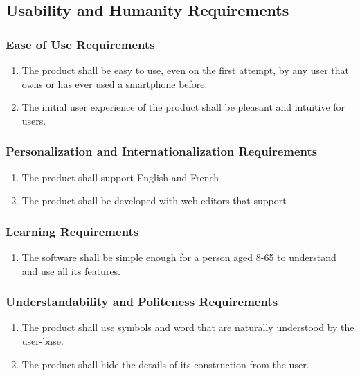 \documentclass[]{article}
\begin{document}

\subsection{Usability and Humanity Requirements}
\label{sub:usability_and_humanity_requirements}

\subsubsection{Ease of Use Requirements}
\label{ssub:ease_of_use_requirements}
\begin{enumerate}[{UH}1. ]
	\item The product shall be easy to use, even on the first attempt, by any user that owns or has ever used a smartphone before.
	\item The initial user experience of the product shall be pleasant and intuitive for users.
\end{enumerate}

\subsubsection{Personalization and Internationalization Requirements}
\label{ssub:personalization_and_internationalization_requirements}
\begin{enumerate}[{UH}1. ]
	\item The product shall support English and French
	\item The product shall be developed with web editors that support
\end{enumerate}

\subsubsection{Learning Requirements}
\label{ssub:learning_requirements}
\begin{enumerate}[{UH}1. ]
	\item The software shall be simple enough for a person aged 8-65 to understand and use all its features.
\end{enumerate}

\subsubsection{Understandability and Politeness Requirements}
\label{ssub:understandability_and_politeness_requirements}
\begin{enumerate}[{UH}1. ]
	\item  The product shall use symbols and word that are naturally understood by the user-base.
	\item  The product shall hide the details of its construction from the user.
\end{enumerate}
\end{document}
